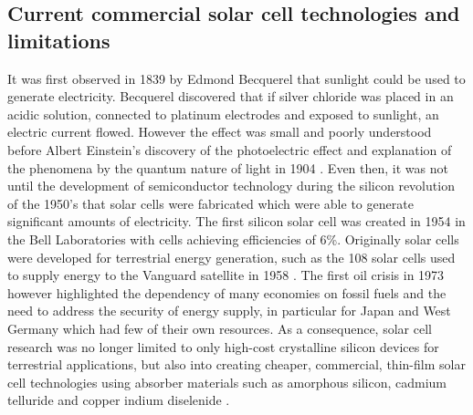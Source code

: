 \documentclass[11pt, twoside]{report}
\begin{document}



\subsection{Current commercial solar cell technologies and limitations}\label{current_tech}
It was first observed in 1839 by Edmond Becquerel that sunlight could be used to generate electricity. Becquerel discovered that if  silver chloride was placed in an acidic solution, connected to platinum electrodes and exposed to sunlight, an electric current flowed. However the effect was small and poorly understood before Albert Einstein's discovery of the photoelectric effect and explanation of the phenomena by the quantum nature of light in 1904 \cite{PV_history1}. Even then, it was not until the development of semiconductor technology during the silicon revolution of the 1950's that solar cells were fabricated which were able to generate significant amounts of electricity. The first silicon solar cell was created in 1954 in the Bell Laboratories with cells achieving efficiencies of 6\%. 
Originally solar cells were developed for terrestrial energy generation, such as the 108 solar cells used to supply energy to the Vanguard satellite in 1958 \cite{PV_history1}. The first oil crisis in 1973 however highlighted the dependency of many economies on fossil fuels and the need to address the security of energy supply,  in particular for Japan and West Germany which had few of their own resources. As a consequence, solar cell research was no longer limited to only high-cost crystalline silicon devices for terrestrial applications, but also into creating cheaper, commercial, thin-film solar cell technologies using absorber materials such as amorphous silicon, cadmium telluride and copper indium diselenide  \cite{PV_history2}.
\end{document}
